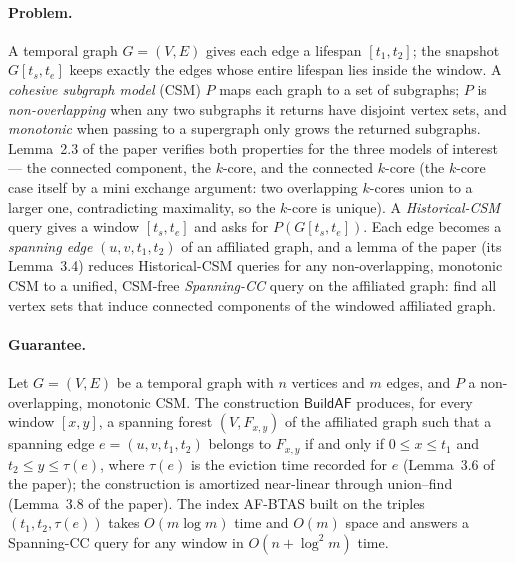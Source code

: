 \paragraph{Problem.}
A temporal graph $G=(V,E)$ gives each edge a lifespan $[t_1,t_2]$; the snapshot
$G[t_s,t_e]$ keeps exactly the edges whose entire lifespan lies inside the window. A
\emph{cohesive subgraph model} (CSM) $P$ maps each graph to a set of subgraphs;
$P$ is \emph{non-overlapping} when any two subgraphs it returns have disjoint vertex
sets, and \emph{monotonic} when passing to a supergraph only grows the returned
subgraphs. Lemma~2.3 of the paper verifies both properties for the three models of
interest --- the connected component, the $k$-core, and the connected $k$-core (the
$k$-core case itself by a mini exchange argument: two overlapping $k$-cores union to
a larger one, contradicting maximality, so the $k$-core is unique). A
\emph{Historical-CSM} query gives a window $[t_s,t_e]$ and asks for
$P(G[t_s,t_e])$. Each edge becomes a \emph{spanning edge} $(u,v,t_1,t_2)$ of an
affiliated graph, and a lemma of the paper (its Lemma~3.4) reduces Historical-CSM
queries for any non-overlapping, monotonic CSM to a unified, CSM-free
\emph{Spanning-CC} query on the affiliated graph: find all vertex sets that induce
connected components of the windowed affiliated graph.

\paragraph{Guarantee.}

\begin{theorem}\label{thm:exc-200-index}
Let $G=(V,E)$ be a temporal graph with $n$ vertices and $m$ edges, and $P$ a
non-overlapping, monotonic CSM. The construction $\mathsf{BuildAF}$ produces, for
every window $[x,y]$, a spanning forest $(V,F_{x,y})$ of the affiliated graph such
that a spanning edge $e=(u,v,t_1,t_2)$ belongs to $F_{x,y}$ if and only if
$0\le x\le t_1$ and $t_2\le y\le\tau(e)$, where $\tau(e)$ is the eviction time
recorded for $e$ (Lemma~3.6 of the paper); the construction is amortized near-linear
through union--find (Lemma~3.8 of the paper). The index AF-BTAS built on the triples
$(t_1,t_2,\tau(e))$ takes $O(m\log m)$ time and $O(m)$ space and answers a Spanning-CC
query for any window in $O(n+\log^{2}m)$ time. \eop
\end{theorem}

